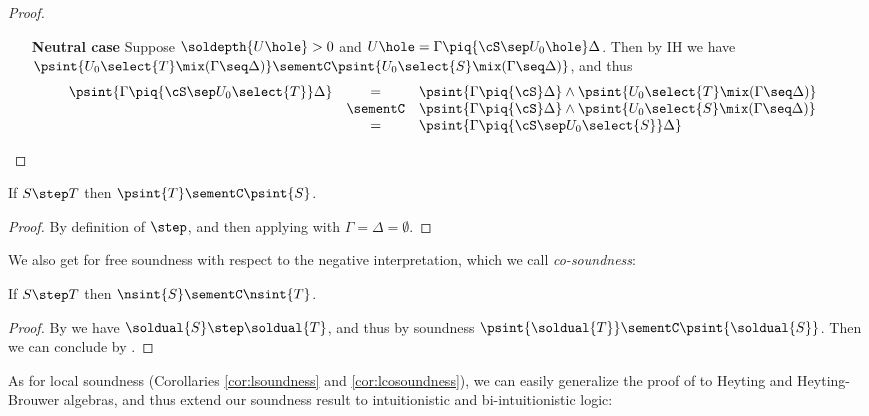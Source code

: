\begin{proof}
\begin{itemize}
    \item[\textbf{Neutral case}] Suppose $\soldepth{U\hole} > 0$ and $U\hole =
    \Gamma \piq{\cS \sep U_0\hole} \Delta$. Then by IH we have
    $\psint{U_0\select{T} \mix (\Gamma \seq \Delta)} \sementC
    \psint{U_0\select{S} \mix (\Gamma \seq \Delta)}$, and thus
    $$
    \begin{array}{rcll}
      \psint{\Gamma \piq{\cS \sep U_0\select{T}} \Delta}
      &=& \psint{\Gamma \piq{\cS} \Delta} \land \psint{U_0\select{T} \mix (\Gamma \seq \Delta)} &\\
      &\sementC& \psint{\Gamma \piq{\cS} \Delta} \land \psint{U_0\select{S} \mix (\Gamma \seq \Delta)} &\\
      &=& \psint{\Gamma \piq{\cS \sep U_0\select{S}} \Delta} &
    \end{array}
    $$
  \end{itemize}
\end{proof}

\begin{theorem}[Soundness]
  If $S \step T$ then $\psint{T} \sementC \psint{S}$.
\end{theorem}
\begin{proof}
  By definition of $\step$, and then applying 
  with $\Gamma = \Delta = \emptyset$.
\end{proof}

We also get for free soundness with respect to the negative interpretation,
which we call \emph{co-soundness}:

\begin{theorem}[Co-soundness]
  If $S \step T$ then $\nsint{S} \sementC \nsint{T}$.
\end{theorem}
\begin{proof}
  By  we have $\soldual{S} \step \soldual{T}$,
  and thus by soundness $\psint{\soldual{T}} \sementC \psint{\soldual{S}}$. Then
  we can conclude by .
\end{proof}

As for local soundness (Corollaries \ref{cor:lsoundness} and
\ref{cor:lcosoundness}), we can easily generalize the proof of
 to Heyting and Heyting-Brouwer algebras, and
thus extend our soundness result to intuitionistic and bi-intuitionistic logic:

